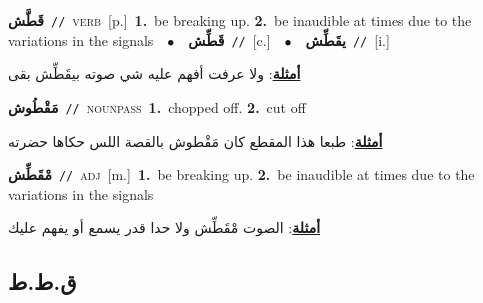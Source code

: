 \documentclass[10pt,a4paper,twoside]{article} %
\begin{document}
\begin{multicols}{2}
{\setlength\topsep{0pt}\textbf{\foreignlanguage{arabic}{قَطَّش}}\ {\color{gray}\texttt{//}\color{black}}\ \textsc{verb}\ [p.]\ \textbf{1.}~be breaking up.  \textbf{2.}~be inaudible at times due to the variations in the signals\ \ $\bullet$\ \ \setlength\topsep{0pt}\textbf{\foreignlanguage{arabic}{قَطِّش}}\ {\color{gray}\texttt{//}\color{black}}\ [c.]\ \ $\bullet$\ \ \setlength\topsep{0pt}\textbf{\foreignlanguage{arabic}{يقَطِّش}}\ {\color{gray}\texttt{//}\color{black}}\ [i.]\  \begin{flushright}\color{gray}\foreignlanguage{arabic}{\textbf{\underline{\foreignlanguage{arabic}{أمثلة}}}: ولا عرفت أفهم عليه شي صوته بيقَطِّش بقى}\end{flushright}\color{black}} \vspace{2mm}

{\setlength\topsep{0pt}\textbf{\foreignlanguage{arabic}{مَقْطُوش}}\ {\color{gray}\texttt{//}\color{black}}\ \textsc{noun\textunderscore pass}\ \textbf{1.}~chopped off.  \textbf{2.}~cut off\  \begin{flushright}\color{gray}\foreignlanguage{arabic}{\textbf{\underline{\foreignlanguage{arabic}{أمثلة}}}: طبعا هذا المقطع كان مَقْطوش بالقصة اللس حكاها حضرته}\end{flushright}\color{black}} \vspace{2mm}

{\setlength\topsep{0pt}\textbf{\foreignlanguage{arabic}{مْقَطِّش}}\ {\color{gray}\texttt{//}\color{black}}\ \textsc{adj}\ [m.]\ \textbf{1.}~be breaking up.  \textbf{2.}~be inaudible at times due to the variations in the signals\  \begin{flushright}\color{gray}\foreignlanguage{arabic}{\textbf{\underline{\foreignlanguage{arabic}{أمثلة}}}: الصوت مْقَطِّش ولا حدا قدر يسمع أو يفهم عليك}\end{flushright}\color{black}} \vspace{2mm}

\vspace{-3mm}
\subsection*{\color{blue}\foreignlanguage{arabic}{ق.ط.ط}\color{blue}{}} 


\end{multicols}
\end{document}
